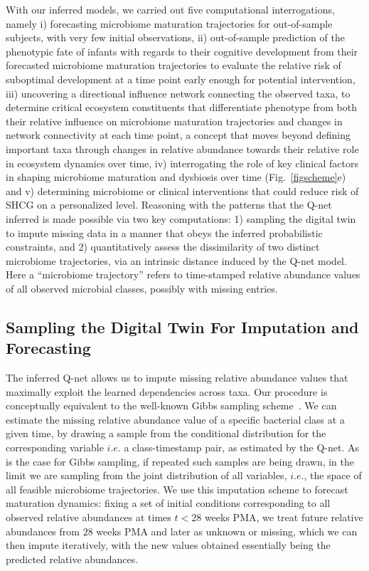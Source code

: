 \documentclass[onecolumn,10pt]{IEEEtran}
\def\qnet{Q-net\xspace}
\begin{document}
With our inferred models, we carried out five computational interrogations, namely i) forecasting microbiome maturation trajectories for out-of-sample subjects, with very few initial observations, ii) out-of-sample  prediction of  the phenotypic fate of infants with regards to their cognitive development from their forecasted microbiome maturation trajectories to evaluate the relative risk of suboptimal development at a time point early enough for potential intervention, iii) uncovering a directional influence network connecting the observed taxa, to determine critical ecosystem constituents that differentiate phenotype from both their relative influence on microbiome maturation trajectories and changes in network connectivity at each time point, a concept that moves beyond defining important taxa through changes in relative abundance towards their relative role in ecosystem dynamics over time, iv) interrogating the role of key clinical factors in shaping  microbiome maturation and dysbiosis over time (Fig.~\ref{figscheme}e) and v) determining microbiome or clinical interventions that could reduce risk of SHCG on a personalized level. Reasoning with the patterns that the \qnet inferred is made possible via two key computations: 1) sampling the digital twin to impute missing data in a manner that obeys the inferred probabilistic constraints, and 2) quantitatively assess the dissimilarity of two distinct  microbiome trajectories, via  an  intrinsic distance  induced by the \qnet model. Here a ``microbiome trajectory'' refers to time-stamped relative abundance values of all observed microbial classes, possibly with  missing entries. 
%
\subsection*{Sampling the Digital Twin For Imputation and Forecasting}
The inferred \qnet allows us to impute missing relative abundance values that maximally exploit the learned dependencies across taxa. Our procedure  is conceptually equivalent  to the well-known Gibbs sampling scheme~\cite{geman1984stochastic,casella1992explaining}. We can  estimate the  missing relative abundance value of a specific bacterial class at a given time, by drawing a sample from the conditional distribution for the corresponding variable $i.e.$ a class-timestamp pair, as estimated by the \qnet. As is the case for  Gibbs sampling, if repeated such samples are being drawn, in the limit we are  sampling from  the joint distribution of all variables, $i.e.$,  the space of all feasible microbiome trajectories. We use this imputation scheme  to forecast maturation dynamics: fixing a set of initial conditions corresponding to all observed relative abundances at times $t < 28$ weeks PMA, we treat future relative abundances from $28$ weeks PMA and later as unknown or missing,  which we can then impute iteratively, with the new values obtained essentially being the predicted relative abundances. 
\end{document}

